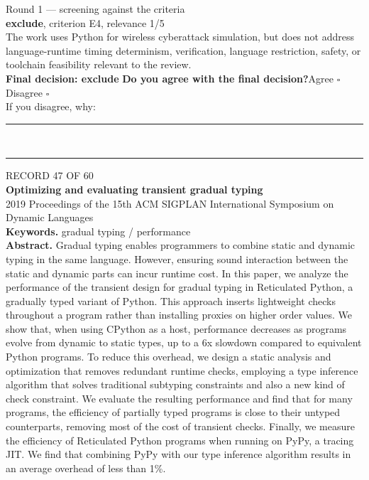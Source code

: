 \documentclass[11pt,a4paper]{article}
\begin{document}
{\footnotesize\color{soft}Round 1 --- screening against the criteria}\\[0.5mm]
{\small\textbf{exclude}, criterion E4, relevance 1/5}\\[0.5mm]
{\small The work uses Python for wireless cyberattack simulation, but does not address language-runtime timing determinism, verification, language restriction, safety, or toolchain feasibility relevant to the review.}\\[2.5mm]
{\small\textbf{Final decision: exclude}}
\vspace{2mm}
{\small\textbf{Do you agree with the final decision?}\quad{}Agree $\square$\qquad{}Disagree $\square$}\\[1mm]
{\footnotesize\color{soft}If you disagree, why:}\\[1mm]
\color{rule}\rule{\linewidth}{0.3pt}\\[3mm]\rule{\linewidth}{0.3pt}\color{black}
\clearpage
{\color{soft}\footnotesize RECORD 47 OF 60}\\[1mm]
{\large\bfseries Optimizing and evaluating transient gradual typing}\\[1.5mm]
{\color{soft}\small 2019 \textperiodcentered{} Proceedings of the 15th ACM SIGPLAN International Symposium on Dynamic Languages}\\[2mm]
{\small\textbf{Keywords.} gradual typing / performance}\\[2mm]
{\small\textbf{Abstract.} Gradual typing enables programmers to combine static and dynamic typing in the same language. However, ensuring sound interaction between the static and dynamic parts can incur runtime cost. In this paper, we analyze the performance of the transient design for gradual typing in Reticulated Python, a gradually typed variant of Python. This approach inserts lightweight checks throughout a program rather than installing proxies on higher order values. We show that, when using CPython as a host, performance decreases as programs evolve from dynamic to static types, up to a 6x slowdown compared to equivalent Python programs. To reduce this overhead, we design a static analysis and optimization that removes redundant runtime checks, employing a type inference algorithm that solves traditional subtyping constraints and also a new kind of check constraint. We evaluate the resulting performance and find that for many programs, the efficiency of partially typed programs is close to their untyped counterparts, removing most of the cost of transient checks. Finally, we measure the efficiency of Reticulated Python programs when running on PyPy, a tracing JIT. We find that combining PyPy with our type inference algorithm results in an average overhead of less than 1\%.}
\end{document}
